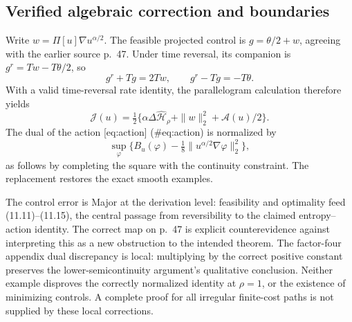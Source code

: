 \documentclass[10pt]{article}
\begin{document}
\subsection*{Verified algebraic correction and boundaries}
Write \(w=\Pi[u]\nabla u^{\alpha/2}\). The feasible projected control is \(g=\theta/2+w\), agreeing with the earlier source p. 47. Under time reversal, its companion is \(g^r=Tw-T\theta/2\), so \[g^r+Tg=2Tw,\qquad g^r-Tg=-T\theta.\] With a valid time-reversal rate identity, the parallelogram calculation therefore yields \[\mathcal J(u)=\tfrac12\{\alpha\Delta\widehat{\mathcal H}_\rho+\|w\|_2^2+\mathcal A(u)/2\}.\] The dual of the action [eq:action] (\#eq:action) is normalized by \[\sup_\varphi\{B_u(\varphi)-\tfrac18
 \|u^{\alpha/2}\nabla\varphi\|_2^2\},\] as follows by completing the square with the continuity constraint. The replacement restores the exact smooth examples.\par
The control error is Major at the derivation level: feasibility and optimality feed (11.11)–(11.15), the central passage from reversibility to the claimed entropy–action identity. The correct map on p. 47 is explicit counterevidence against interpreting this as a new obstruction to the intended theorem. The factor-four appendix dual discrepancy is local: multiplying by the correct positive constant preserves the lower-semicontinuity argument’s qualitative conclusion. Neither example disproves the correctly normalized identity at \(\rho=1\), or the existence of minimizing controls. A complete proof for all irregular finite-cost paths is not supplied by these local corrections.\par
\end{document}
